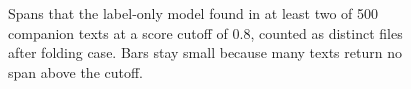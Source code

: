 \begin{figure}[ht]
  \centering
  
  \caption{Spans that the label-only model found in at least two of 500 companion texts at a score cutoff of 0.8, counted as distinct files after folding case.
    Bars stay small because many texts return no span above the cutoff.}
  \label{fig:label-only-top}
\end{figure}
